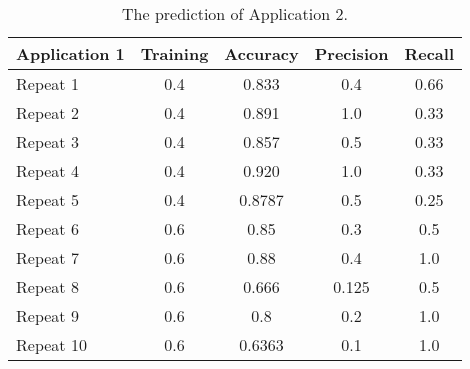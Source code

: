 \begin{table}[ht]
	\begin{center}
		\begin{tabular}{ | l | c | c | c | c | }
			\hline
			Application 1 & Training & Accuracy & Precision & Recall \\ \hline
			Repeat 1 & 0.4 & 0.833  & 0.4  & 0.66  \\ \hline
			Repeat 2 & 0.4 & 0.891  & 1.0  & 0.33  \\ \hline
			Repeat 3 & 0.4 & 0.857  & 0.5  & 0.33  \\ \hline
			Repeat 4 & 0.4 & 0.920  & 1.0  & 0.33  \\ \hline
			Repeat 5 & 0.4 & 0.8787 & 0.5 & 0.25   \\ \hline
			Repeat 6 & 0.6 & 0.85   & 0.3  & 0.5   \\ \hline
			Repeat 7 & 0.6 & 0.88   & 0.4  & 1.0   \\ \hline
			Repeat 8 & 0.6 & 0.666  & 0.125& 0.5   \\ \hline
			Repeat 9 & 0.6 & 0.8    & 0.2  & 1.0   \\ \hline
			Repeat 10& 0.6 & 0.6363 & 0.1  & 1.0   \\ \hline
		\end{tabular}
		\caption{ The prediction of Application 2. }
		\label{PredictResult2}
	\end{center}
\end{table}